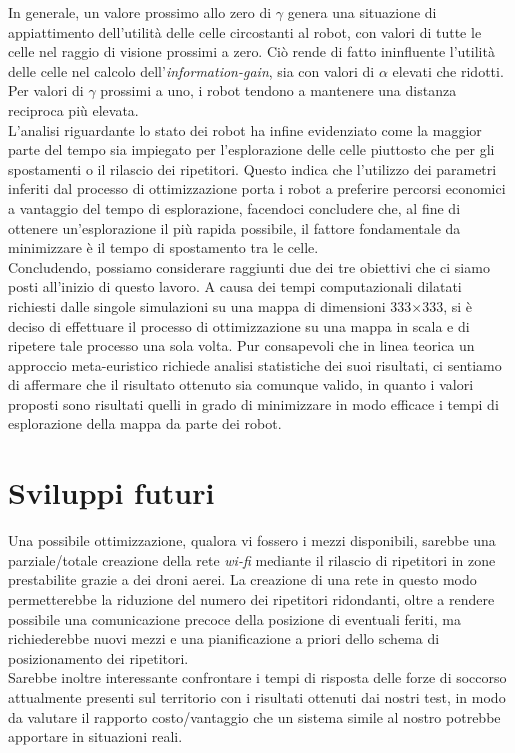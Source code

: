 In generale, un valore prossimo allo zero di $\gamma$ genera una situazione di appiattimento dell'utilità delle celle circostanti al robot, con valori di tutte le celle nel raggio di visione prossimi a zero.
Ciò rende di fatto ininfluente l'utilità delle celle nel calcolo dell'\textit{information-gain}, sia con valori di $\alpha$ elevati che ridotti. 
Per valori di $\gamma$ prossimi a uno, i robot tendono a mantenere una distanza reciproca più elevata.\\
L'analisi riguardante lo stato dei robot ha infine evidenziato come la maggior parte del tempo sia impiegato per l'esplorazione delle celle piuttosto che per gli spostamenti o il rilascio dei ripetitori.
Questo indica che l'utilizzo dei parametri inferiti dal processo di ottimizzazione porta i robot a preferire percorsi economici a vantaggio del tempo di esplorazione, facendoci concludere che, al fine di ottenere un'esplorazione il più rapida possibile, il fattore fondamentale da minimizzare è il tempo di spostamento tra le celle.\\

Concludendo, possiamo considerare raggiunti due dei tre obiettivi che ci siamo posti all'inizio di questo lavoro.
A causa dei tempi computazionali dilatati richiesti dalle singole simulazioni su una mappa di dimensioni 333$\times$333, si è deciso di effettuare il processo di ottimizzazione su una mappa in scala e di ripetere tale processo una sola volta.
Pur consapevoli che in linea teorica un approccio meta-euristico richiede analisi statistiche dei suoi risultati, ci sentiamo di affermare che il risultato ottenuto sia comunque valido, in quanto i valori proposti sono risultati quelli in grado di minimizzare in modo efficace i tempi di esplorazione della mappa da parte dei robot. 
\section{Sviluppi futuri}
Una possibile ottimizzazione, qualora vi fossero i mezzi disponibili, sarebbe una parziale/totale creazione della rete \textit{wi-fi} mediante il rilascio di ripetitori in zone prestabilite grazie a dei droni aerei.
La creazione di una rete in questo modo permetterebbe la riduzione del numero dei ripetitori ridondanti, oltre a rendere possibile una comunicazione precoce della posizione di eventuali feriti, ma richiederebbe nuovi mezzi e una pianificazione a priori dello schema di posizionamento dei ripetitori.\\
Sarebbe inoltre interessante confrontare i tempi di risposta delle forze di soccorso attualmente presenti sul territorio con i risultati ottenuti dai nostri test, in modo da valutare il rapporto costo/vantaggio che un sistema simile al nostro potrebbe apportare in situazioni reali.